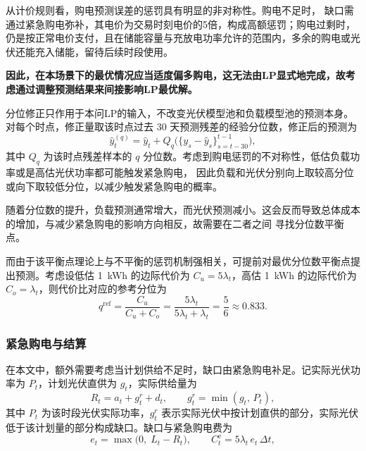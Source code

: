 \documentclass[zihao=-4,a4paper,fontset=none]{ctexart}
\begin{document}
从计价规则看，购电预测误差的惩罚具有明显的非对称性。购电不足时，
缺口需通过紧急购电弥补，其电价为交易时刻电价的5倍，构成高额惩罚；购电过剩时，
仍是按正常电价支付，且在储能容量与充放电功率允许的范围内，多余的购电或光伏还能充入储能，留待后续时段使用。

\textbf{因此，在本场景下的最优情况应当适度偏多购电，这无法由LP显式地完成，故考虑通过调整预测结果来间接影响LP最优解。}


分位修正只作用于本问LP的输入，不改变光伏模型池和负载模型池的预测本身。
对每个时点，修正量取该时点过去 30 天预测残差的经验分位数，修正后的预测为
\begin{equation}
\hat y_{t}^{(q)}=\hat y_t+Q_q\bigl(\{y_s-\hat y_s\}_{s=t-30}^{t-1}\bigr),
\label{eq:qra}
\end{equation}
其中 $Q_q$ 为该时点残差样本的 $q$ 分位数。考虑到购电惩罚的不对称性，低估负载功率或是高估光伏功率都可能触发紧急购电，
因此负载和光伏分别向上取较高分位或向下取较低分位，以减少触发紧急购电的概率。

随着分位数的提升，负载预测通常增大，而光伏预测减小。这会反而导致总体成本的增加，与减少紧急购电的影响方向相反，故需要在二者之间
寻找分位数平衡点。

而由于该平衡点理论上与不平衡的惩罚机制强相关，可提前对最优分位数平衡点提出预测。考虑设低估 1~kWh 的边际代价为
 $C_u=5\lambda_t$，高估 1~kWh 的边际代价为 $C_o=\lambda_t$，则代价比对应的参考分位为
\begin{equation}
q^{\mathrm{ref}}=\frac{C_u}{C_u+C_o}=\frac{5\lambda_t}{5\lambda_t+\lambda_t}=\frac{5}{6}\approx 0.833.
\label{eq:newsvendor}
\end{equation}

\subsubsection{紧急购电与结算}
\label{sub:p2settle}

在本文中，额外需要考虑当计划供给不足时，缺口由紧急购电补足。记实际光伏功率为 $P_t$，计划光伏直供为 $g_t$，实际供给量为
\begin{equation}
R_t=a_t+g_t^{r}+d_t ,\qquad g_t^{r}=\min(g_t,\,P_t) ,
\label{eq:supply}
\end{equation}
其中 $P_t$ 为该时段光伏实际功率，$g_t^{r}$ 表示实际光伏中按计划直供的部分，实际光伏低于该计划量的部分构成缺口。缺口与紧急购电费为
\begin{equation}
e_t=\max\bigl(0,\;L_t-R_t\bigr),\qquad C_t^{\mathrm{e}}=5\lambda_t\,e_t\,\Delta t ,
\label{eq:gap}
\end{equation}
\end{document}
